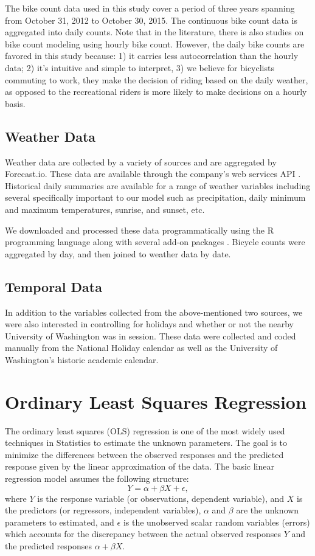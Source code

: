 \documentclass [11pt, proquest] {uwthesis}[2015/03/03]
\begin{document}
The bike count data used in this study cover a period of three years spanning from October 31, 2012 to October 30, 2015. The continuous bike count data is aggregated into daily counts. Note that in the literature, there is also studies on bike count modeling using hourly bike count. However, the daily bike counts are favored in this study because: 1) it carries less autocorrelation than the hourly data; 2) it's intuitive and simple to interpret, 3) we believe for bicyclists commuting to work, they make the decision of riding based on the daily weather, as opposed to the recreational riders is more likely to make decisions on a hourly basis. 

\subsection{Weather Data}
Weather data are collected by a variety of sources and are aggregated by Forecast.io. These data are available through the company's web services API \cite{The-Dark-Sky-Company:aa}. Historical daily summaries are available for a range of weather variables including several specifically important to our model such as precipitation, daily minimum and maximum temperatures, sunrise, and sunset, etc.

We downloaded and processed these data programmatically using the R programming language along with several add-on packages \cite{Grolemund:2011aa,Wickham:2011aa,Couture-Beil:2014aa,Lang:2014aa,R-Core-Team:2014aa}. Bicycle counts were aggregated by day, and then joined to weather data by date. 

\subsection{Temporal Data}
In addition to the variables collected from the above-mentioned two sources, we were also interested in controlling for holidays and whether or not the nearby University of Washington was in session. These data were collected and coded manually from the National Holiday calendar as well as the University of Washington's historic academic calendar.


\section{Ordinary Least Squares Regression}
The ordinary least squares (OLS) regression is one of the most widely used techniques in Statistics to estimate the unknown parameters. The goal is to minimize the differences between the observed responses and the predicted response given by the linear approximation of the data. The basic linear regression model assumes the following structure:
\begin{equation}
Y = \alpha + \beta X + \epsilon, \label{eqn:olsregression}
\end{equation}
where $Y$ is the response variable (or observations, dependent variable), and $X$ is the predictors (or regressors, independent variables), $\alpha$ and $\beta$ are the unknown parameters to estimated, and $\epsilon$ is the unobserved scalar random variables (errors) which accounts for the discrepancy between the actual observed responses $Y$ and the predicted responses $\alpha + \beta X$.  
\end{document}
